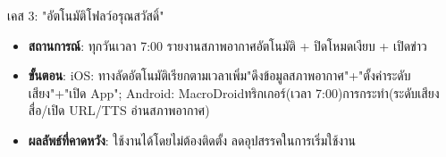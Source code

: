 \begin{tcbinfo}{เคส 3: "อัตโนมัติโฟลว์อรุณสวัสดิ์"}
\begin{itemize}
  \item \textbf{สถานการณ์}: ทุกวันเวลา 7:00 รายงานสภาพอากาศอัตโนมัติ + ปิดโหมดเงียบ + เปิดข่าว
  \item \textbf{ขั้นตอน}: iOS: ทางลัดอัตโนมัติเรียกตามเวลาเพิ่ม"ดึงข้อมูลสภาพอากาศ"+"ตั้งค่าระดับเสียง"+"เปิด App"; Android: MacroDroidทริกเกอร์(เวลา 7:00)การกระทำ(ระดับเสียงสื่อ/เปิด URL/TTS อ่านสภาพอากาศ)
  \item \textbf{ผลลัพธ์ที่คาดหวัง}: ใช้งานได้โดยไม่ต้องติดตั้ง ลดอุปสรรคในการเริ่มใช้งาน
\end{itemize}

\end{tcbinfo}
